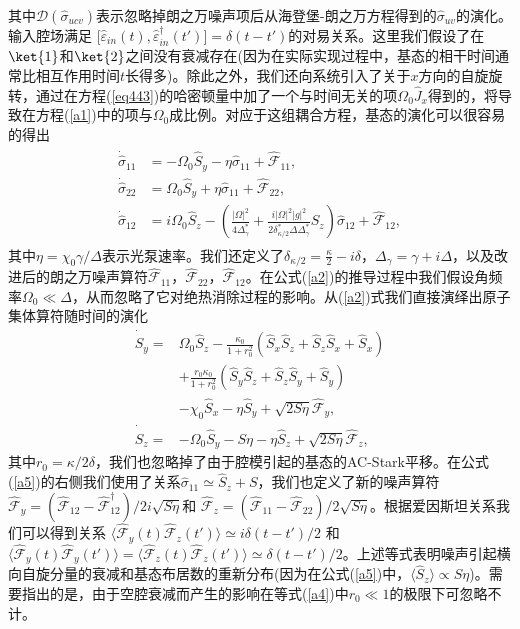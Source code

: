 其中$\mathcal {D}(\hat\sigma_{ucv})$表示忽略掉朗之万噪声项后从海登堡-朗之万方程得到的${\hat\sigma}_{uv}$的演化。输入腔场满足 $\lbrack\hat\varepsilon_{in}(t),\hat\varepsilon_{in}^\dag(t')\rbrack=\delta(t-t')$的对易关系。这里我们假设了在$\ket{1}$和$\ket{2}$之间没有衰减存在(因为在实际实现过程中，基态的相干时间通常比相互作用时间$t$长得多)。除此之外，我们还向系统引入了关于$x$方向的自旋旋转，通过在方程(\ref{eq443})的哈密顿量中加了一个与时间无关的项$\Omega_0 \hat J_x$得到的，将导致在方程(\ref{a1})中的项与$\Omega_0 $成比例。对应于这组耦合方程，基态的演化可以很容易的得出
\begin{align}\label{a2}
	\begin{split}
		\dot {\hat \sigma}_{11} &= -\Omega_0 {\hat S}_y - \eta{\hat\sigma}_{11} +\hat{\mathcal{F}}_{11}, \\
		\dot {\hat \sigma}_{22} &= \Omega_0 {\hat S}_y +\eta{\hat\sigma}_{11}+\hat{\mathcal{F}}_{22},\\
		\dot {\hat \sigma}_{12} &= i\Omega_0 {\hat S}_z - \left(\frac{|\Omega|^2}{4\Delta_\gamma^\ast}+  \frac{i|\Omega|^2|g|^2}{2\delta_{\kappa/2}^\ast\Delta\Delta_\gamma^\ast}S_z\right){\hat\sigma}_{12}+\hat{\mathcal{F}}_{12}, 
	\end{split}
\end{align}
其中$\eta=\chi_0\gamma/\Delta$表示光泵速率。我们还定义了$\delta_{\kappa/2}=\frac\kappa2-i\delta$，$\Delta_\gamma=\gamma+i\Delta$，以及改进后的朗之万噪声算符$\hat{\mathcal{F}}_{11}$，$\hat{\mathcal{F}}_{22}$，$\hat{\mathcal{F}}_{12}$。在公式(\ref{a2})的推导过程中我们假设角频率$\Omega_0\ll \Delta$，从而忽略了它对绝热消除过程的影响。从(\ref{a2})式我们直接演绎出原子集体算符随时间的演化
\begin{align}
	{{\dot {\hat S}}_y} =&   {\Omega _0}{{\hat S}_z} - \frac{\kappa_0}{1+r_0^2}\left( {{{\hat S}_x}{{\hat S}_z} + {{\hat S}_z}{{\hat S}_x} + {{\hat S}_x}} \right)\nonumber\\
	&+ \frac{r_0\kappa_0}{1+r_0^2}\left( {{{\hat S}_y}{{\hat S}_z} + {{\hat S}_z}{{\hat S}_y} + {{\hat S}_y}} \right)\label{a4}\\
	&- {\chi _0}{{\hat S}_x} - \eta {{\hat S}_y} + \sqrt {2S\eta } {\hat {\mathcal{F}}_y},\nonumber\\
	\dot {\hat S}_z=&  -\Omega_0 {\hat S}_y - S\eta- \eta{\hat S}_z  +\sqrt{2S\eta}\hat{\mathcal{F}}_z,\label{a5}
\end{align}
其中$r_0=\kappa/2\delta$，我们也忽略掉了由于腔模引起的基态的AC-Stark平移。在公式(\ref{a5})的右侧我们使用了关系$\hat\sigma_{11}\simeq\hat S_z+S$，我们也定义了新的噪声算符$\hat{\mathcal{F}}_y= (\hat{\mathcal{F}}_{12}-\hat{\mathcal{F}}_{12}^\dag)/2i\sqrt{S\eta}$和 $\hat{\mathcal{F}}_z= (\hat{\mathcal{F}}_{11}-\hat{\mathcal{F}}_{22})/2\sqrt{S\eta}$。根据爱因斯坦关系我们可以得到关系 $\langle\hat{\mathcal{F}}_y(t) \hat{\mathcal{F}}_z(t')\rangle\simeq i\delta(t-t')/2$ 和 $\langle\hat{\mathcal{F}}_y(t)\hat{\mathcal{F}}_y(t')\rangle=\langle\hat{\mathcal{F}}_z(t)\hat{\mathcal{F}}_z(t')\rangle\simeq \delta(t-t')/2$。上述等式表明噪声引起横向自旋分量的衰减和基态布居数的重新分布(因为在公式(\ref{a5})中，$\langle \hat S_z\rangle\propto S\eta$)。需要指出的是，由于空腔衰减而产生的影响在等式(\ref{a4})中$r_0\ll 1$的极限下可忽略不计。